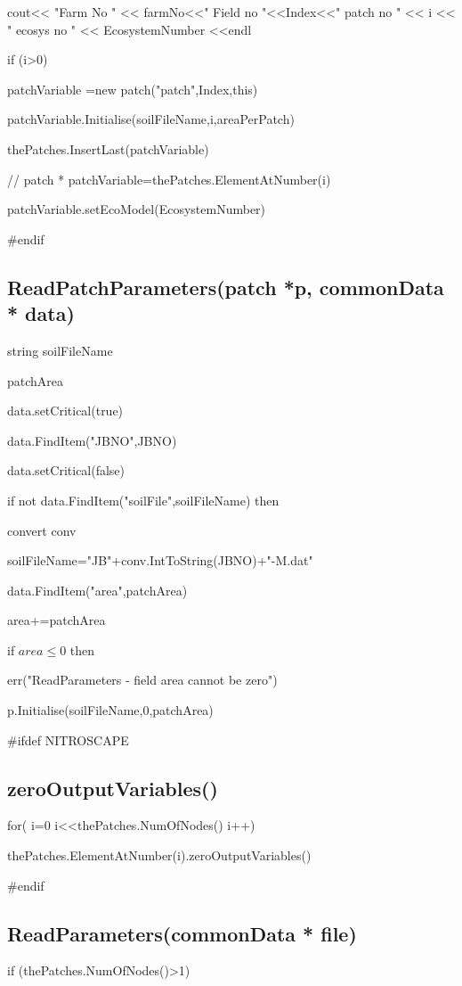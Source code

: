 \documentclass[%
]{scrartcl}
\begin{document}
 \quad			cout<< "Farm No " << farmNo<<" Field no "<<Index<<" patch no " << i << " ecosys no " << EcosystemNumber <<endl
     
   \quad	    if (i>0)
      
    \quad	     \quad	  patchVariable =new patch("patch",Index,this)
      
   \quad	     \quad	   patchVariable.Initialise(soilFileName,i,areaPerPatch)
       
  \quad	       \quad	  thePatches.InsertLast(patchVariable)
      
 \quad	//		patch * patchVariable=thePatches.ElementAtNumber(i)

 \quad		patchVariable.setEcoModel(EcosystemNumber)

\#endif


\subsection{ReadPatchParameters(patch *p, commonData * data)}

	string soilFileName

   patchArea
   
   data.setCritical(true)
   
   data.FindItem("JBNO",JBNO)
   
   data.setCritical(false)
   
   if  not data.FindItem("soilFile",soilFileName) then
   
    \quad	   convert conv
    
       \quad soilFileName="JB"+conv.IntToString(JBNO)+"-M.dat"
   
   data.FindItem("area",patchArea)
   
   area+=patchArea
   
   if $area\le 0$ then
   
   \quad  err("ReadParameters - field area cannot be zero")
   
   p.Initialise(soilFileName,0,patchArea)


\#ifdef NITROSCAPE
\subsection{zeroOutputVariables()}

	for( i=0 i<<thePatches.NumOfNodes() i++)
		
\quad		 thePatches.ElementAtNumber(i).zeroOutputVariables()
	

\#endif


\subsection{ReadParameters(commonData * file)}
   if (thePatches.NumOfNodes()>1)
   
\end{document}
